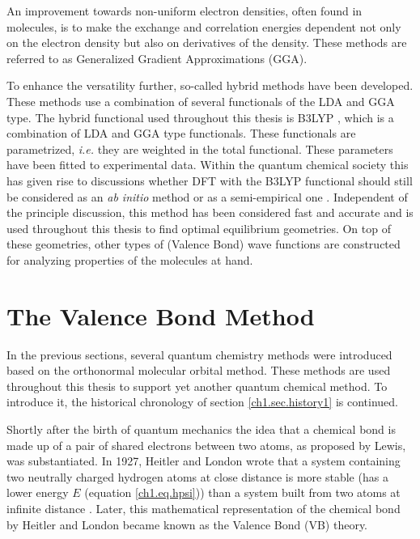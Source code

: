 An improvement towards non-uniform electron densities, often found in molecules, is to make the exchange and correlation energies dependent not only on the electron density but also on derivatives of the density. These methods are referred to as Generalized Gradient Approximations (GGA).

To enhance the versatility further, so-called hybrid methods have been developed. These methods use a combination of several functionals of the LDA and GGA type. The hybrid functional used throughout this thesis is B3LYP \cite{b3lyp1,b3lyp2,b3lyp3}, which is a combination of LDA and GGA type functionals. These functionals are parametrized, \textit{i.e.} they are weighted in the total functional. These parameters have been fitted to experimental data. Within the quantum chemical society this has given rise to discussions whether DFT with the B3LYP functional should still be considered as an \textit{ab initio} method or as a semi-empirical one \cite{jensen}. Independent of the principle discussion, this method has been considered fast and accurate and is used throughout this thesis to find optimal equilibrium geometries. On top of these geometries, other types of (Valence Bond) wave functions are constructed for analyzing properties of the molecules at hand.

\section{The Valence Bond Method}

In the previous sections, several quantum chemistry methods were introduced based on the orthonormal molecular orbital method. These methods are used throughout this thesis to support yet another quantum chemical method. To introduce it, the historical chronology of section \ref{ch1.sec.history1} is continued.

Shortly after the birth of quantum mechanics the idea that a chemical bond is made up of a pair of shared electrons between two atoms, as proposed by Lewis, was substantiated. In 1927, Heitler and London wrote that a system containing two neutrally charged hydrogen atoms at close distance is more stable (has a lower energy $E$ (equation \ref{ch1.eq.hpsi})) than a system built from two atoms at infinite distance \cite{heitler}. Later, this mathematical representation of the chemical bond by Heitler and London became known as the Valence Bond (VB) theory. 

